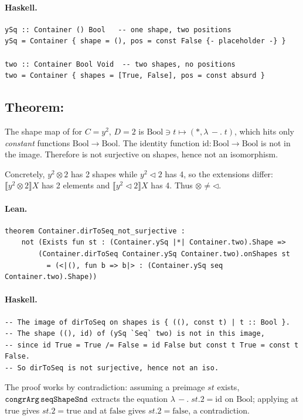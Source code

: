 \documentclass[11pt,a4paper]{article}
\begin{document}
\paragraph{Haskell.}
\begin{lstlisting}[style=haskell]
ySq :: Container () Bool   -- one shape, two positions
ySq = Container { shape = (), pos = const False {- placeholder -} }

two :: Container Bool Void  -- two shapes, no positions
two = Container { shapes = [True, False], pos = const absurd }
\end{lstlisting}


\subsection{Theorem: }

\begin{thm}
The shape map of  for $C = y^2$, $D = 2$ is
$\mathrm{Bool} \ni t \mapsto (\ast, \lambda\,{-}.\;t)$, which hits only
\emph{constant} functions $\mathrm{Bool} \to \mathrm{Bool}$.  The identity
function $\mathrm{id} : \mathrm{Bool} \to \mathrm{Bool}$ is not in the image.
Therefore  is not surjective on shapes, hence not an
isomorphism.

Concretely, $y^2 \otimes 2$ has 2 shapes while $y^2 \triangleleft 2$ has 4,
so the extensions differ: $\llbracket y^2 \otimes 2 \rrbracket X$ has 2
elements and $\llbracket y^2 \triangleleft 2 \rrbracket X$ has 4.
Thus $\otimes \neq \triangleleft$.
\end{thm}

\paragraph{Lean.}
\begin{lstlisting}[style=lean]
theorem Container.dirToSeq_not_surjective :
    not (Exists fun st : (Container.ySq |*| Container.two).Shape =>
        (Container.dirToSeq Container.ySq Container.two).onShapes st
          = (<|(), fun b => b|> : (Container.ySq seq Container.two).Shape))
\end{lstlisting}

\paragraph{Haskell.}
\begin{lstlisting}[style=haskell]
-- The image of dirToSeq on shapes is { ((), const t) | t :: Bool }.
-- The shape ((), id) of (ySq `Seq` two) is not in this image,
-- since id True = True /= False = id False but const t True = const t False.
-- So dirToSeq is not surjective, hence not an iso.
\end{lstlisting}

\begin{fidelitynote}
The proof works by contradiction: assuming a preimage $st$ exists,
$\texttt{congrArg}\,\texttt{seqShapeSnd}$ extracts the equation
$\lambda\,{-}.\;st.2 = \mathrm{id}$ on $\mathrm{Bool}$; applying at
$\mathrm{true}$ gives $st.2 = \mathrm{true}$ and at $\mathrm{false}$ gives
$st.2 = \mathrm{false}$, a contradiction.
\end{fidelitynote}
\end{document}
